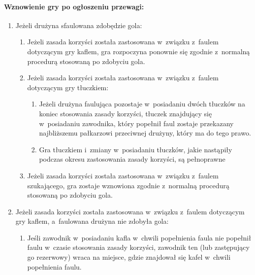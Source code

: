 \documentclass[12pt]{article}
\begin{document}
\paragraph{Wznowienie gry po ogłoszeniu przewagi:}

\begin{enumerate}
	\item
	      Jeżeli drużyna sfaulowana zdobędzie gola:

	      \begin{enumerate}
		      \item
		            Jeżeli zasada korzyści została zastosowana w~związku z~faulem
		            dotyczącym gry kaflem, gra rozpoczyna ponownie się zgodnie z~normalną procedurą stosowaną po zdobyciu gola.
		      \item
		            Jeżeli zasada korzyści została zastosowana w~związku z~faulem
		            dotyczącym gry tłuczkiem:

		            \begin{enumerate}
			            \item
			                  Jeżeli drużyna faulująca pozostaje w~posiadaniu dwóch tłuczków na
			                  koniec stosowania zasady korzyści, tłuczek znajdujący się w~posiadaniu zawodnika, który popełnił faul zostaje przekazany
			                  najbliższemu pałkarzowi przeciwnej drużyny, który ma do tego
			                  prawo.
			            \item
			                  Gra tłuczkiem i~zmiany w~posiadaniu tłuczków, jakie nastąpiły
			                  podczas okresu zastosowania zasady korzyści, są pełnoprawne
		            \end{enumerate}
		      \item
		            Jeżeli zasada korzyści została zastosowana w~związku z~faulem
		            szukającego, gra zostaje wznowiona zgodnie z~normalną procedurą
		            stosowaną po zdobyciu gola.
	      \end{enumerate}
	\item
	      Jeżeli zasada korzyści została zastosowana w~związku z~faulem
	      dotyczącym gry kaflem, a~faulowana drużyna nie zdobyła gola:

	      \begin{enumerate}
		      \item
		            Jeśli zawodnik w~posiadaniu kafla w~chwili popełnienia faula nie
		            popełnił faulu w~czasie stosowania zasady korzyści, zawodnik ten
		            (lub zastępujący go rezerwowy) wraca na miejsce, gdzie znajdował się
		            kafel w~chwili popełnienia faulu.


\end{enumerate}
\end{enumerate}
\end{document}
